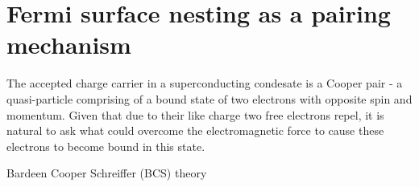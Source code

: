 
\section{Fermi surface nesting as a pairing mechanism}

The accepted charge carrier in a superconducting condesate is a Cooper pair - a quasi-particle comprising of a bound state of two electrons with opposite spin and momentum. Given that due to their like charge two free electrons repel, it is natural to ask what could overcome the electromagnetic force to cause these electrons to become bound in this state.


Bardeen Cooper Schreiffer (BCS) theory

